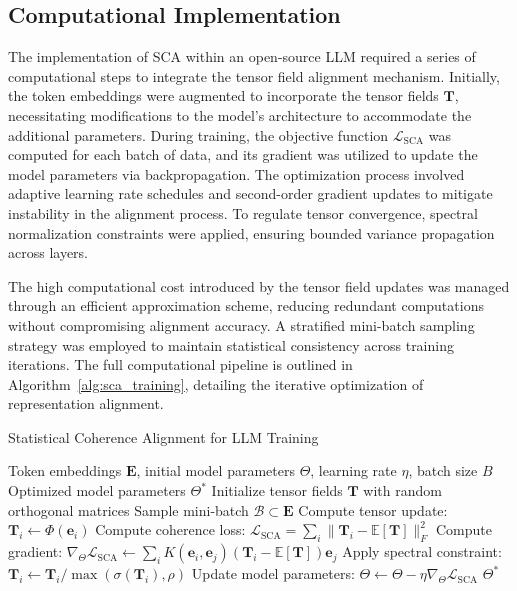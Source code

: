 \documentclass{article}
\begin{document}
\subsection{Computational Implementation}

The implementation of SCA within an open-source LLM required a series of computational steps to integrate the tensor field alignment mechanism. Initially, the token embeddings were augmented to incorporate the tensor fields \( \mathbf{T} \), necessitating modifications to the model's architecture to accommodate the additional parameters. During training, the objective function \( \mathcal{L}_{\text{SCA}} \) was computed for each batch of data, and its gradient was utilized to update the model parameters via backpropagation. The optimization process involved adaptive learning rate schedules and second-order gradient updates to mitigate instability in the alignment process. To regulate tensor convergence, spectral normalization constraints were applied, ensuring bounded variance propagation across layers.

The high computational cost introduced by the tensor field updates was managed through an efficient approximation scheme, reducing redundant computations without compromising alignment accuracy. A stratified mini-batch sampling strategy was employed to maintain statistical consistency across training iterations. The full computational pipeline is outlined in Algorithm~\ref{alg:sca_training}, detailing the iterative optimization of representation alignment.

\begin{algorithm}[h]
	\caption{Statistical Coherence Alignment for LLM Training}
	\label{alg:sca_training}
	\begin{algorithmic}[1]
		\Require Token embeddings \( \mathbf{E} \), initial model parameters \( \Theta \), learning rate \( \eta \), batch size \( B \)
		\Ensure Optimized model parameters \( \Theta^* \)
		\State Initialize tensor fields \( \mathbf{T} \) with random orthogonal matrices
		\State Sample mini-batch \( \mathcal{B} \subset \mathbf{E} \)
		\State Compute tensor update: \( \mathbf{T}_i \gets \Phi(\mathbf{e}_i) \)
		\State Compute coherence loss: \( \mathcal{L}_{\text{SCA}} = \sum_i \|\mathbf{T}_i - \mathbb{E}[\mathbf{T}]\|_F^2 \)
		\EndFor
		\State Compute gradient: \( \nabla_\Theta \mathcal{L}_{\text{SCA}} \gets \sum_{i} K(\mathbf{e}_i, \mathbf{e}_j) (\mathbf{T}_i - \mathbb{E}[\mathbf{T}]) \mathbf{e}_j \)
		\State Apply spectral constraint: \( \mathbf{T}_i \gets \mathbf{T}_i / \max(\sigma(\mathbf{T}_i), \rho) \)
		\State Update model parameters: \( \Theta \gets \Theta - \eta \nabla_\Theta \mathcal{L}_{\text{SCA}} \)
		\EndWhile
		\State \Return \( \Theta^* \)
	\end{algorithmic}
\end{algorithm}
\end{document}
